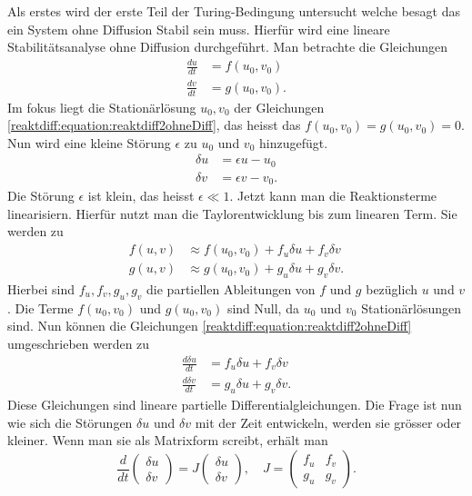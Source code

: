 Als erstes wird der erste Teil der Turing-Bedingung untersucht welche besagt das ein System ohne Diffusion Stabil sein muss.
Hierfür wird eine lineare Stabilitätsanalyse ohne Diffusion durchgeführt.
Man betrachte die Gleichungen
\begin{align}
    \label{reaktdiff:equation:reaktdiff2ohneDiff}
    \frac{du}{dt} &= f(u_0,v_0)\\
    \frac{dv}{dt} &= g(u_0,v_0).
\end{align}
Im fokus liegt die Stationärlösung \(u_0, v_0\) der Gleichungen \ref{reaktdiff:equation:reaktdiff2ohneDiff}, das heisst das \(f(u_0,v_0) = g(u_0,v_0) = 0\).
Nun wird eine kleine Störung \(\epsilon\) zu \(u_0\) und \(v_0\) hinzugefügt.
\begin{align}
    \delta u &= \epsilon u - u_0 \\
    \delta v &= \epsilon v - v_0.
\end{align}
Die Störung \(\epsilon\) ist klein, das heisst \(\epsilon \ll 1\).
Jetzt kann man die Reaktionsterme linearisiern.
Hierfür nutzt man die Taylorentwicklung bis zum linearen Term.
Sie werden zu
\begin{align}
    f(u,v) &\approx f(u_0,v_0) + f_u \delta u + f_v\delta v\\
    g(u,v) &\approx g(u_0,v_0) + g_u \delta u + g_v\delta v.
\end{align}
Hierbei sind \(f_u, f_v, g_u, g_v\) die partiellen Ableitungen von \(f\) und \(g\) bezüglich \(u\) und \(v\).
Die Terme \(f(u_0,v_0)\) und \(g(u_0,v_0)\) sind Null, da \(u_0\) und \(v_0\) Stationärlösungen sind.
Nun können die Gleichungen \ref{reaktdiff:equation:reaktdiff2ohneDiff} umgeschrieben werden zu
\begin{align}
    \label{reaktdiff:equation:reaktdiff2ohneDifflinearisiert1}
    \frac{d \delta u}{dt} &= f_u \delta u + f_v \delta v\\
    \label{reaktdiff:equation:reaktdiff2ohneDifflinearisiert2}
    \frac{d \delta v}{dt} &= g_u \delta u + g_v \delta v.
\end{align}
Diese Gleichungen sind lineare partielle Differentialgleichungen.
Die Frage ist nun wie sich die Störungen \(\delta u\) und \(\delta v\) mit der Zeit entwickeln, werden sie grösser oder kleiner.
Wenn man sie als Matrixform screibt, erhält man
\begin{equation}
    \label{reaktdiff:equation:reaktdiff2ohneDiffmatrix}
    \frac{d}{dt} \begin{pmatrix}
        \delta u\\
        \delta v
    \end{pmatrix} = 
    J 
    \begin{pmatrix}
        \delta u\\
        \delta v
    \end{pmatrix}
    , \quad
    J =
    \begin{pmatrix}
        f_u & f_v\\
        g_u & g_v
    \end{pmatrix}.
\end{equation}

